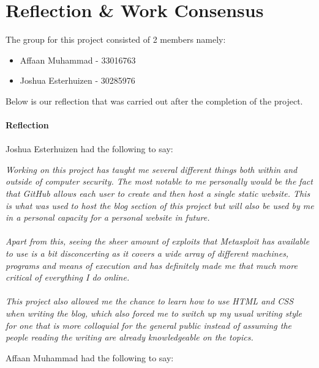 \documentclass[a4paper, 12pt, titlepage]{report}
\begin{document}
\section{Reflection \& Work Consensus}
The group for this project consisted of 2 members namely:
\begin{itemize}
    \item Affaan Muhammad - 33016763
    \item Joshua Esterhuizen - 30285976
\end{itemize}
Below is our reflection that was carried out after the completion of the project.\\\\
\textbf{Reflection}\\\\
Joshua Esterhuizen had the following to say:
\begin{displayquote}
\textit{Working on this project has taught me several different things both within and outside of computer security. The most notable to me personally would be the fact that GitHub allows each user to create and then host a single static website. This is what was used to host the blog section of this project but will also be used by me in a personal capacity for a personal website in future. 
\\\\
Apart from this, seeing the sheer amount of exploits that Metasploit has available to use is a bit disconcerting as it covers a wide array of different machines, programs and means of execution and has definitely made me that much more critical of everything I do online. 
\\\\
This project also allowed me the chance to learn how to use HTML and CSS when writing the blog, which also forced me to switch up my usual writing style for one that is more colloquial for the general public instead of assuming the people reading the writing are already knowledgeable on the topics. 
}
\end{displayquote}
\pagebreak
Affaan Muhammad had the following to say:
\end{document}
